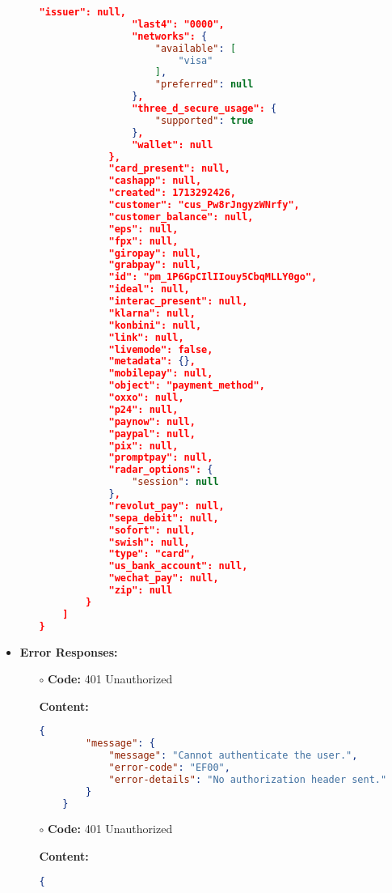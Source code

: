 \begin{itemize}
\begin{itemize}
\begin{lstlisting}[language=json]
                "issuer": null,
                "last4": "0000",
                "networks": {
                    "available": [
                        "visa"
                    ],
                    "preferred": null
                },
                "three_d_secure_usage": {
                    "supported": true
                },
                "wallet": null
            },
            "card_present": null,
            "cashapp": null,
            "created": 1713292426,
            "customer": "cus_Pw8rJngyzWNrfy",
            "customer_balance": null,
            "eps": null,
            "fpx": null,
            "giropay": null,
            "grabpay": null,
            "id": "pm_1P6GpCIlIIouy5CbqMLLY0go",
            "ideal": null,
            "interac_present": null,
            "klarna": null,
            "konbini": null,
            "link": null,
            "livemode": false,
            "metadata": {},
            "mobilepay": null,
            "object": "payment_method",
            "oxxo": null,
            "p24": null,
            "paynow": null,
            "paypal": null,
            "pix": null,
            "promptpay": null,
            "radar_options": {
                "session": null
            },
            "revolut_pay": null,
            "sepa_debit": null,
            "sofort": null,
            "swish": null,
            "type": "card",
            "us_bank_account": null,
            "wechat_pay": null,
            "zip": null
        }
    ]
}
			\end{lstlisting}
		\end{itemize}
	   \item \textbf{Error Responses:}
    	\begin{itemize}
			\item[$\circ$] \textbf{Code:} 401 Unauthorized
			\item[] \textbf{Content:}
			\begin{lstlisting}[language=json]
    {
        "message": {
            "message": "Cannot authenticate the user.",
            "error-code": "EF00",
            "error-details": "No authorization header sent."
        }
    }
			\end{lstlisting}
		\end{itemize}
    	\begin{itemize}
			\item[$\circ$] \textbf{Code:} 401 Unauthorized
			\item[] \textbf{Content:}
			\begin{lstlisting}[language=json]
	{

\end{lstlisting}
\end{itemize}
\end{itemize}
